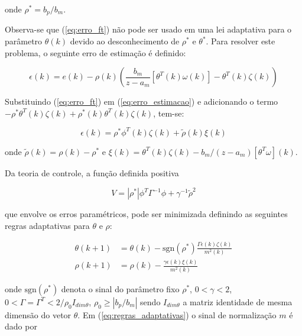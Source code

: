     onde $\rho^* = b_p / b_m$.

    Observa-se que (\ref{eq:erro_ft}) não pode ser usado em uma lei adaptativa para
    o parâmetro $\theta (k)$ devido ao desconhecimento de $\rho^*$ e $\theta^*$. Para
    resolver este problema, o seguinte erro de estimação é definido:

    \begin{equation}
        \epsilon (k) = e (k) - \rho(k) \left( \frac{b_m}{z - a_m} \left[ \theta^T (k) \omega(k)
            \right] - \theta^T (k) \zeta(k) \right)
        \label{eq:erro_estimacao}
    \end{equation}

    Substituindo (\ref{eq:erro_ft}) em (\ref{eq:erro_estimacao}) e adicionando o termo
    $-\rho^* \theta^T (k) \zeta (k) + \rho^* (k) \theta^T (k) \zeta(k)$, tem-se:

    \begin{equation}
        \epsilon(k) = \rho^* \phi^T(k) \zeta(k) + \tilde{\rho}(k) \xi(k)
        \label{eq:epsilon_k}
    \end{equation}

    onde $\tilde{\rho}(k) = \rho(k) - \rho^*$ e $\xi(k) = \theta^T(k) \zeta(k) -
    b_m / (z - a_m)[\theta^T \omega](k)$.

    Da teoria de controle, a função definida positiva

    \begin{equation}
        V = |\rho^*| \phi^T \Gamma^{-1} \phi + \gamma^{-1} {\tilde{\rho}}^2
        \label{eq:funcao_positiva}
    \end{equation}

    que envolve os erros paramétricos, pode ser minimizada definindo as seguintes
    regras adaptativas para $\theta$ e $\rho$:

    \begin{subequations}
        \begin{align}
            \theta(k + 1) & = \theta(k) - \text{sgn}(\rho^*)\frac{\Gamma \epsilon(k)\zeta(k)}{m^2(k)} \\
            \rho(k + 1) & = \rho(k) - \frac{\gamma \epsilon(k) \xi(k)}{m^2(k)}
        \end{align}
        \label{eq:regras_adaptativas}
    \end{subequations}

    onde $\text{sgn}(\rho^*)$ denota o sinal do parâmetro fixo $\rho^*$,
    $0 < \gamma < 2$, $0 < \Gamma = \Gamma^T < 2/\rho_0 I_{dim \theta}$,
    $\rho_0 \geq |b_p / b_m|$ sendo $I_{dim \theta}$ a matriz identidade de mesma
    dimensão do vetor $\theta$. Em (\ref{eq:regras_adaptativas}) o sinal de
    normalização $m$ é dado por

